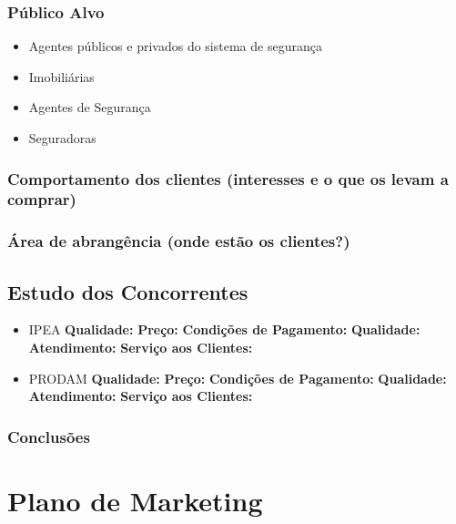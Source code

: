 \documentclass[
	12pt,				%
	openright,			%
	twoside,			%
	a4paper,			%
	english,			%
	french,				%
	spanish,			%
	brazil,				%
	]{abntex2}
\begin{document}
\subsection{Público Alvo}

\begin{itemize}
	\item Agentes públicos e privados do sistema de segurança
	\item Imobiliárias
	\item Agentes de Segurança
	\item Seguradoras
\end{itemize}

\subsection{Comportamento dos clientes (interesses e o que os levam a comprar)}


\subsection{Área de abrangência (onde estão os clientes?)}

\section{Estudo dos Concorrentes}

\begin{itemize}
	\item IPEA 
		\subitem \textbf{Qualidade:} 
		\subitem \textbf{Preço:} 
		\subitem \textbf{Condições de Pagamento:} 
		\subitem \textbf{Qualidade:} 
		\subitem \textbf{Atendimento:} 
		\subitem \textbf{Serviço aos Clientes:} 

	\item PRODAM 
		\subitem \textbf{Qualidade:} 
		\subitem \textbf{Preço:} 
		\subitem \textbf{Condições de Pagamento:} 
		\subitem \textbf{Qualidade:} 
		\subitem \textbf{Atendimento:} 
		\subitem \textbf{Serviço aos Clientes:} 
		 
\end{itemize}

\subsection*{Conclusões}



\chapter{Plano de Marketing}
\end{document}
